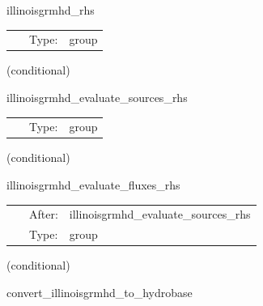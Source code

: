 \hspace{5mm} illinoisgrmhd\_rhs 

\hspace{5mm}{\it evaluate rhss grhd equations } 


\hspace{5mm}

 \begin{tabular*}{160mm}{cll} 
~ & Type:  & group \\ 
\end{tabular*} 


\vspace{5mm}

   (conditional) 

\hspace{5mm} illinoisgrmhd\_evaluate\_sources\_rhs 

\hspace{5mm}{\it evaluate source terms in grmhd rhss } 


\hspace{5mm}

 \begin{tabular*}{160mm}{cll} 
~ & Type:  & group \\ 
\end{tabular*} 


\vspace{5mm}

   (conditional) 

\hspace{5mm} illinoisgrmhd\_evaluate\_fluxes\_rhs 

\hspace{5mm}{\it evaluate flux terms in grmhd rhss } 


\hspace{5mm}

 \begin{tabular*}{160mm}{cll} 
~ & After:  & illinoisgrmhd\_evaluate\_sources\_rhs \\ 
~ & Type:  & group \\ 
\end{tabular*} 


\vspace{5mm}

   (conditional) 

\hspace{5mm} convert\_illinoisgrmhd\_to\_hydrobase 

\hspace{5mm}{\it convert needed hydrobase variables for nrpyleakage } 


